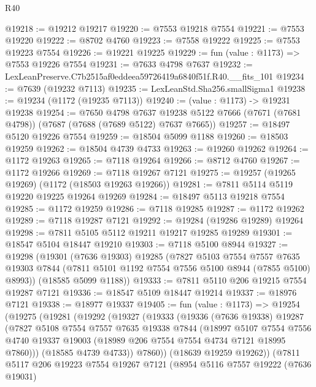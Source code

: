 \begin{lexlean}{R40}
\begin{coremodule}
@19218 := @19212 @19217
@19220 := @7553 @19218 @7554
@19221 := @7553 @19220
@19222 := @8702 @4760
@19223 := @7558 @19222
@19225 := @7553 @19223 @7554
@19226 := @19221 @19225
@19229 := fun (value : @1173) => @7553 @19226 @7554
@19231 := @7633 @4798 @7637
@19232 := LexLeanPreserve.C7b2515af0eddeea59726419a6840f51f.R40.__fits_101
@19234 := @7639 (@19232 @7113)
@19235 := LexLeanStd.Sha256.smallSigma1
@19238 := @19234 (@1172 (@19235 @7113))
@19240 := (value : @1173) -> @19231 @19238
@19254 := @7650
    @4798
    @7637
    @19238
    @5122
    @7666
    (@7671 (@7681 @4798))
    (@7687 (@7688 (@7689 @5122) @7637 @7665))
@19257 := @18497 @5120 @19226 @7554
@19259 := @18504 @5099 @1188
@19260 := @18503 @19259
@19262 := @18504 @4739 @4733
@19263 := @19260 @19262
@19264 := @1172 @19263
@19265 := @7118 @19264
@19266 := @8712 @4760
@19267 := @1172 @19266
@19269 := @7118 @19267 @7121
@19275 := @19257 (@19265 @19269) (@1172 (@18503 @19263 @19266))
@19281 := @7811 @5114 @5119 @19220 @19225 @19264 @19269
@19284 := @18497 @5113 @19218 @7554
@19285 := @1172 @19259
@19286 := @7118 @19285
@19287 := @1172 @19262
@19289 := @7118 @19287 @7121
@19292 := @19284 (@19286 @19289) @19264
@19298 := @7811 @5105 @5112 @19211 @19217 @19285 @19289
@19301 := @18547 @5104 @18447 @19210
@19303 := @7118 @5100 @8944
@19327 := @19298
    (@19301
      (@7636 @19303)
      @19285
      (@7827
        @5103
        @7554
        @7557
        @7635
        @19303
        @7844
        (@7811 @5101 @1192 @7554 @7556 @5100 @8944 (@7855 @5100) @8993))
      (@18585 @5099 @1188))
@19333 := @7811 @5110 @206 @19215 @7554 @19287 @7121
@19336 := @18547 @5109 @18447 @19214
@19337 := @18976 @7121
@19338 := @18977 @19337
@19405 := fun (value : @1173) =>
  @19254
    (@19275
      (@19281
        (@19292
          (@19327
            (@19333
              (@19336
                (@7636 @19338)
                @19287
                (@7827
                  @5108
                  @7554
                  @7557
                  @7635
                  @19338
                  @7844
                  (@18997
                    @5107
                    @7554
                    @7556
                    @4740
                    @19337
                    @19003
                    (@18989 @206 @7554 @7554 @4734 @7121 @18995 @7860)))
                (@18585 @4739 @4733))
              @7860))
          (@18639 @19259 @19262))
        (@7811
          @5117
          @206
          @19223
          @7554
          @19267
          @7121
          (@8954
            @5116
            @7557
            @19222
            (@7636 @19031)

\end{coremodule}
\end{lexlean}
